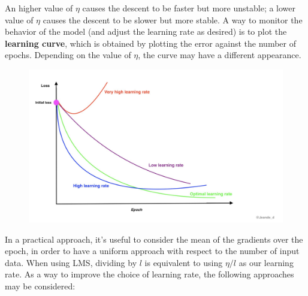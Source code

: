 An higher value of $\eta$ causes the descent to be faster but more unstable; a lower value of $\eta$ causes the descent to be slower but more stable. A way to monitor the behavior of the model (and adjust the learning rate as desired) is to plot the \textbf{learning curve}, which is obtained by plotting the error against the number of epochs. Depending on the value of $\eta$, the curve may have a different appearance.
\begin{figure}[ht]
    \centering
    \includegraphics[width=0.5\linewidth]{img/Learning curve and eta.png}
\end{figure}
In a practical approach, it's useful to consider the mean of the gradients over the epoch, in order to have a uniform approach with respect to the number of input data. When using LMS, dividing by $l$ is equivalent to using $\eta/l$ as our learning rate. As a way to improve the choice of learning rate, the following approaches may be considered:
